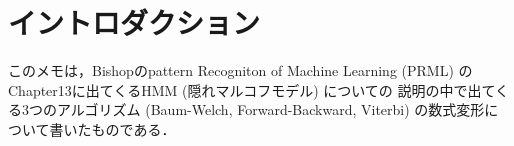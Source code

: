 \section{イントロダクション}
\label{sec:Introduction}
このメモは，Bishopのpattern Recogniton of Machine Learning (PRML) 
\cite{Bishop:PRMLBook:2006}のChapter13に出てくるHMM (隠れマルコフモデル) についての
説明の中で出てくる3つのアルゴリズム (Baum-Welch, Forward-Backward, Viterbi)
の数式変形について書いたものである．
